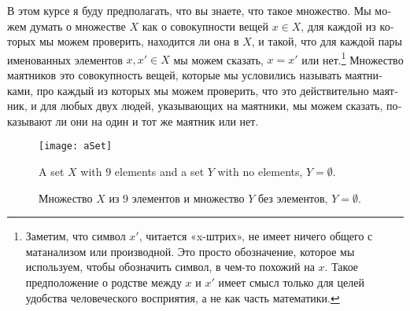 \documentclass[a4paper]{book}
\theoremstyle{myth}
\begin{document}
\begin{english}
\begin{russian}В этом курсе я буду предполагать, что вы знаете, что такое множество. Мы можем думать о множестве $X$ как о совокупности вещей $x\in X$, для каждой из которых мы можем проверить, находится ли она в $X$, и такой, что для каждой пары именованных элементов $x,x'\in X$ мы можем сказать, $x=x'$ или нет.\footnote{Заметим, что символ $x'$, читается «x-штрих», не имеет ничего общего с матанализом или производной. Это просто обозначение, которое мы используем, чтобы обозначить символ, в чем-то похожий на $x$. Такое предположение о родстве между $x$ и $x'$ имеет смысл только для целей удобства человеческого восприятия, а не как часть математики.}
Множество маятников это совокупность вещей, которые мы условились называть маятниками, про каждый из которых мы можем проверить, что это действительно маятник, и для любых двух людей, указывающих на маятники, мы можем сказать, показывают ли они на один и тот же маятник или нет. \end{russian}

\begin{figure}
\begin{center}
\texttt{[image: aSet]}
\end{center}
\caption{A set $X$ with $9$ elements and a set $Y$ with no elements, $Y=\emptyset$.}
\begin{russian}\caption{Множество $X$ из $9$ элементов и множество $Y$ без элементов, $Y=\emptyset$.}\end{russian}
\end{figure}


\end{english}
\end{document}
